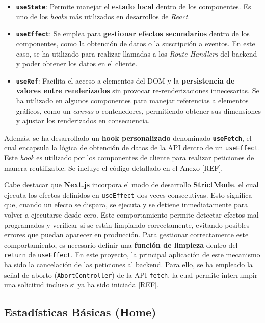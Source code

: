 \begin{itemize}
    \item \textbf{\texttt{useState}}: Permite manejar el \textbf{estado local} dentro de los componentes. Es uno de los \textit{hooks} más utilizados en desarrollos de \textit{React}.

    \item \textbf{\texttt{useEffect}}: Se emplea para \textbf{gestionar efectos secundarios} dentro de los componentes, como la obtención de datos o la suscripción a eventos. En este caso, se ha utilizado para realizar llamadas a los \textit{Route Handlers} del backend y poder obtener los datos en el cliente.

    \item \textbf{\texttt{useRef}}: Facilita el acceso a elementos del DOM y la \textbf{persistencia de valores entre renderizados} sin provocar re-renderizaciones innecesarias. Se ha utilizado en algunos componentes para manejar referencias a elementos gráficos, como un \textit{canvas} o contenedores, permitiendo obtener sus dimensiones y ajustar los renderizados en consecuencia.
\end{itemize}

Además, se ha desarrollado un \textbf{hook personalizado} denominado \textbf{\texttt{useFetch}}, el cual encapsula la lógica de obtención de datos de la API dentro de un \texttt{useEffect}. Este \textit{hook} es utilizado por los componentes de cliente para realizar peticiones de manera reutilizable. Se incluye el código detallado en el Anexo [REF].

Cabe destacar que \textbf{Next.js} incorpora el modo de desarrollo \textbf{StrictMode}, el cual ejecuta los efectos definidos en \texttt{useEffect} dos veces consecutivas. Esto significa que, cuando un efecto se dispara, se ejecuta y se detiene inmediatamente para volver a ejecutarse desde cero. Este comportamiento permite detectar efectos mal programados y verificar si se están limpiando correctamente, evitando posibles errores que puedan aparecer en producción. Para gestionar correctamente este comportamiento, es necesario definir una \textbf{función de limpieza} dentro del \texttt{return} de \texttt{useEffect}. En este proyecto, la principal aplicación de este mecanismo ha sido la cancelación de las peticiones al backend. Para ello, se ha empleado la señal de aborto (\texttt{AbortController}) de la API \texttt{fetch}, la cual permite interrumpir una solicitud incluso si ya ha sido iniciada [REF].

\subsection{Estadísticas Básicas (Home)}

